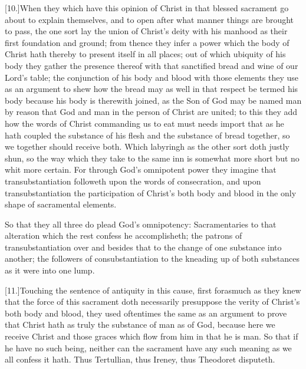 [10.]When they which have this opinion of Christ in that blessed sacrament go about to explain themselves, and to open after what manner things are brought to pass, the one sort lay the union of Christ’s deity with his manhood as their first foundation and ground; from thence they infer a power which the body of Christ hath thereby to present itself in all places; out of which ubiquity of his body they gather the presence thereof with that sanctified bread and wine of our Lord’s table; the conjunction of his body and blood with those elements they use as an argument to shew how the bread may as well in that respect be termed his body because his body is therewith joined, as the Son of God may be named man by reason that God and man in the person of Christ are united; to this they add how the words of Christ commanding us to eat must needs import that as he hath coupled the substance of his flesh and the substance of bread together, so we together should receive both. Which labyringh as the other sort doth justly shun, so the way which they take to the same inn is somewhat more short but no whit more certain. For through God’s omnipotent power they imagine that transubstantiation followeth upon the words of consecration, and upon transubstantiation the participation of Christ’s both body and blood in the only shape of sacramental elements.

So that they all three do plead God’s omnipotency: Sacramentaries to that alteration which the rest confess he accomplisheth; the patrons of transubstantiation over and besides that to the change of one substance into another; the followers of consubstantiation to the kneading up of both substances as it were into one lump.

[11.]Touching the sentence of antiquity in this cause, first forasmuch as they knew that the force of this sacrament doth necessarily presuppose the verity of Christ’s both body and  blood, they used oftentimes the same as an argument to prove that Christ hath as truly the substance of man as of God, because here we receive Christ and those graces which flow from him in that he is man.
 So that if he have no such being, neither can the sacrament have any such meaning as we all confess it hath. Thus Tertullian, thus Ireney, thus Theodoret disputeth.

